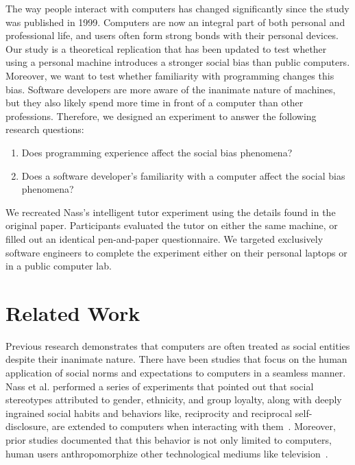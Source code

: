 \documentclass{sig-alternate-05-2015}
\begin{document}
The way people interact with computers has changed significantly since the study was published  in 1999.  Computers are now an integral part of both personal and professional life, and users often form strong bonds with their personal devices. Our study is a theoretical replication that has been updated to test whether using a personal machine introduces a stronger social bias than public computers. Moreover, we want to test whether familiarity with programming changes this bias.  Software developers are more aware of the inanimate nature of machines, but they also likely spend more time in front of a computer than other professions.  Therefore, we designed an experiment to answer the following research questions:

\begin{enumerate}
    \item{Does programming experience affect the social bias phenomena?}
    \item{Does a software developer's familiarity with a computer affect the social bias phenomena? } 
\end{enumerate}

 We recreated Nass's intelligent tutor experiment using the details found in the original paper.  Participants evaluated the tutor on either the same machine, or filled out an identical pen-and-paper questionnaire.  We targeted exclusively software engineers to complete the experiment either on their personal laptops or in a public computer lab.  

\section{Related Work}
Previous research demonstrates that computers are often treated as social entities despite their inanimate nature. There have been studies that focus on the human application of social norms and expectations to computers in a seamless manner. Nass et al. performed a series of experiments that pointed out that social stereotypes attributed to gender, ethnicity, and group loyalty, along with deeply ingrained social habits and behaviors like, reciprocity and reciprocal self-disclosure, are extended to computers when interacting with them~\cite{Nass2000machines,nass1999people}. Moreover, prior studies documented that this behavior is not only limited to computers, human users anthropomorphize other technological mediums like television~\cite{reeves1996people}.
\end{document}
